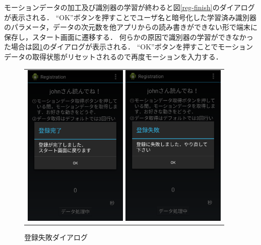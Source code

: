 モーションデータの加工及び識別器の学習が終わると図\ref{reg-finish}のダイアログが表示される．
``OK''ボタンを押すことでユーザ名と暗号化した学習済み識別器のパラメータ，データの次元数を他アプリからの読み書きができない形で端末に保存し，スタート画面に遷移する．
何らかの原因で識別器の学習ができなかった場合は図\ref{reg-error}のダイアログが表示される．
``OK''ボタンを押すことでモーションデータの取得状態がリセットされるので再度モーションを入力する．

\begin{figure}[bthp]
  \centering
  \begin{tabular}{c}
    \begin{minipage}{0.5\hsize}
      \centering
      \includegraphics[bb=0 0 1080 1705, width=5cm]{Screenshots/reg-finish.pdf}
      \caption{登録完了ダイアログ}
      \label{reg-finish}
    \end{minipage}
    \begin{minipage}{0.5\hsize}
      \centering
      \includegraphics[bb=0 0 1080 1705, width=5cm]{Screenshots/reg-error.pdf}
      \caption{登録失敗ダイアログ}
      \label{reg-error}
    \end{minipage}
  \end{tabular}
\end{figure}


